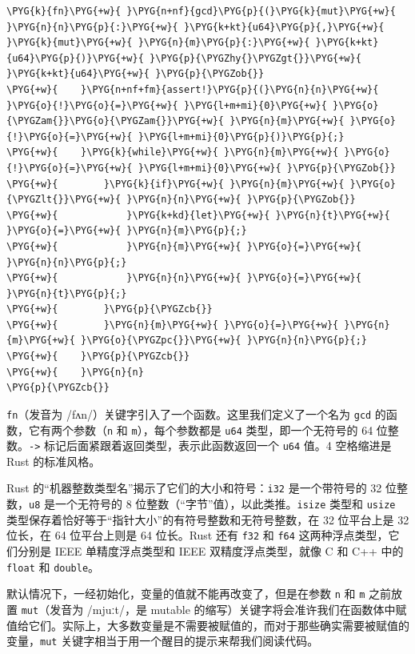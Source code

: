 \begin{Verbatim}[commandchars=\\\{\},breaklines=true,breakanywhere=true,fontsize=\codefont,xleftmargin=17bp]
\PYG{k}{fn}\PYG{+w}{ }\PYG{n+nf}{gcd}\PYG{p}{(}\PYG{k}{mut}\PYG{+w}{ }\PYG{n}{n}\PYG{p}{:}\PYG{+w}{ }\PYG{k+kt}{u64}\PYG{p}{,}\PYG{+w}{ }\PYG{k}{mut}\PYG{+w}{ }\PYG{n}{m}\PYG{p}{:}\PYG{+w}{ }\PYG{k+kt}{u64}\PYG{p}{)}\PYG{+w}{ }\PYG{p}{\PYGZhy{}\PYGZgt{}}\PYG{+w}{ }\PYG{k+kt}{u64}\PYG{+w}{ }\PYG{p}{\PYGZob{}}
\PYG{+w}{    }\PYG{n+nf+fm}{assert!}\PYG{p}{(}\PYG{n}{n}\PYG{+w}{ }\PYG{o}{!}\PYG{o}{=}\PYG{+w}{ }\PYG{l+m+mi}{0}\PYG{+w}{ }\PYG{o}{\PYGZam{}}\PYG{o}{\PYGZam{}}\PYG{+w}{ }\PYG{n}{m}\PYG{+w}{ }\PYG{o}{!}\PYG{o}{=}\PYG{+w}{ }\PYG{l+m+mi}{0}\PYG{p}{)}\PYG{p}{;}
\PYG{+w}{    }\PYG{k}{while}\PYG{+w}{ }\PYG{n}{m}\PYG{+w}{ }\PYG{o}{!}\PYG{o}{=}\PYG{+w}{ }\PYG{l+m+mi}{0}\PYG{+w}{ }\PYG{p}{\PYGZob{}}
\PYG{+w}{        }\PYG{k}{if}\PYG{+w}{ }\PYG{n}{m}\PYG{+w}{ }\PYG{o}{\PYGZlt{}}\PYG{+w}{ }\PYG{n}{n}\PYG{+w}{ }\PYG{p}{\PYGZob{}}
\PYG{+w}{            }\PYG{k+kd}{let}\PYG{+w}{ }\PYG{n}{t}\PYG{+w}{ }\PYG{o}{=}\PYG{+w}{ }\PYG{n}{m}\PYG{p}{;}
\PYG{+w}{            }\PYG{n}{m}\PYG{+w}{ }\PYG{o}{=}\PYG{+w}{ }\PYG{n}{n}\PYG{p}{;}
\PYG{+w}{            }\PYG{n}{n}\PYG{+w}{ }\PYG{o}{=}\PYG{+w}{ }\PYG{n}{t}\PYG{p}{;}
\PYG{+w}{        }\PYG{p}{\PYGZcb{}}
\PYG{+w}{        }\PYG{n}{m}\PYG{+w}{ }\PYG{o}{=}\PYG{+w}{ }\PYG{n}{m}\PYG{+w}{ }\PYG{o}{\PYGZpc{}}\PYG{+w}{ }\PYG{n}{n}\PYG{p}{;}
\PYG{+w}{    }\PYG{p}{\PYGZcb{}}
\PYG{+w}{    }\PYG{n}{n}
\PYG{p}{\PYGZcb{}}
\end{Verbatim}

\texttt{fn}（发音为 /fʌn/）关键字引入了一个函数。这里我们定义了一个名为 \texttt{gcd} 的函数，它有两个参数（\texttt{n} 和 \texttt{m}），每个参数都是 \texttt{u64} 类型，即一个无符号的 64 位整数。\texttt{->} 标记后面紧跟着返回类型，表示此函数返回一个 \texttt{u64} 值。4 空格缩进是 Rust 的标准风格。

Rust 的“机器整数类型名”揭示了它们的大小和符号：\texttt{i32} 是一个带符号的 32 位整数，\texttt{u8} 是一个无符号的 8 位整数（“字节”值），以此类推。\texttt{isize} 类型和 \texttt{usize} 类型保存着恰好等于“指针大小”的有符号整数和无符号整数，在 32 位平台上是 32 位长，在 64 位平台上则是 64 位长。Rust 还有 \texttt{f32} 和 \texttt{f64} 这两种浮点类型，它们分别是 IEEE 单精度浮点类型和 IEEE 双精度浮点类型，就像 C 和 C++ 中的 \texttt{float} 和 \texttt{double}。

默认情况下，一经初始化，变量的值就不能再改变了，但是在参数 \texttt{n} 和 \texttt{m} 之前放置 \texttt{mut}（发音为 /mjuːt/，是 mutable 的缩写）关键字将会准许我们在函数体中赋值给它们。实际上，大多数变量是不需要被赋值的，而对于那些确实需要被赋值的变量，\texttt{mut} 关键字相当于用一个醒目的提示来帮我们阅读代码。

